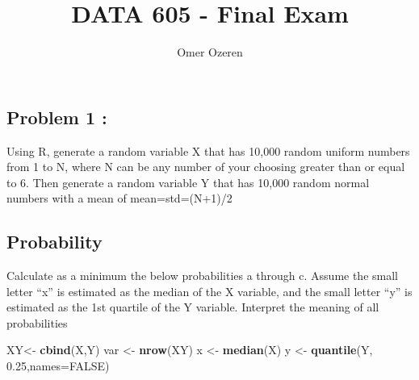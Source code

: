 \documentclass[]{article}
\title{DATA 605 - Final Exam}
\author{Omer Ozeren}
\date{}
\newenvironment{Shaded}{\begin{snugshade}}{\end{snugshade}}
\newcommand{\KeywordTok}[1]{\textcolor[rgb]{0.13,0.29,0.53}{\textbf{#1}}}
\newcommand{\DataTypeTok}[1]{\textcolor[rgb]{0.13,0.29,0.53}{#1}}
\newcommand{\DecValTok}[1]{\textcolor[rgb]{0.00,0.00,0.81}{#1}}
\newcommand{\FloatTok}[1]{\textcolor[rgb]{0.00,0.00,0.81}{#1}}
\newcommand{\StringTok}[1]{\textcolor[rgb]{0.31,0.60,0.02}{#1}}
\newcommand{\CommentTok}[1]{\textcolor[rgb]{0.56,0.35,0.01}{\textit{#1}}}
\newcommand{\OtherTok}[1]{\textcolor[rgb]{0.56,0.35,0.01}{#1}}
\newcommand{\OperatorTok}[1]{\textcolor[rgb]{0.81,0.36,0.00}{\textbf{#1}}}
\newcommand{\NormalTok}[1]{#1}
\begin{document}
\maketitle

{
\setcounter{tocdepth}{3}
\tableofcontents
}
\subsection{Problem 1 :}\label{problem-1}

Using R, generate a random variable X that has 10,000 random uniform
numbers from 1 to N, where N can be any number of your choosing greater
than or equal to 6. Then generate a random variable Y that has 10,000
random normal numbers with a mean of mean=std=(N+1)/2

\begin{Shaded}
\end{Shaded}

\subsection{Probability}\label{probability}

Calculate as a minimum the below probabilities a through c. Assume the
small letter ``x'' is estimated as the median of the X variable, and the
small letter ``y'' is estimated as the 1st quartile of the Y variable.
Interpret the meaning of all probabilities

\begin{Shaded}
\begin{Highlighting}[]
\NormalTok{XY<-}\StringTok{ }\KeywordTok{cbind}\NormalTok{(X,Y)}
\NormalTok{var <-}\StringTok{ }\KeywordTok{nrow}\NormalTok{(XY)}
\NormalTok{x <-}\StringTok{ }\KeywordTok{median}\NormalTok{(X)}
\NormalTok{y <-}\StringTok{ }\KeywordTok{quantile}\NormalTok{(Y, }\FloatTok{0.25}\NormalTok{,}\DataTypeTok{names=}\OtherTok{FALSE}\NormalTok{)}
\end{Highlighting}
\end{Shaded}
\end{document}
